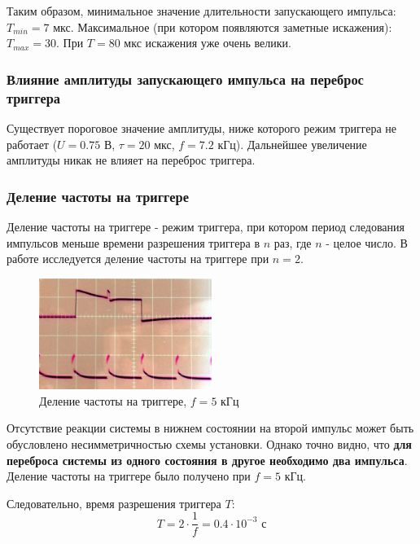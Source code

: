 \documentclass[a4paper,14pt]{extarticle}
\begin{document}
Таким образом, минимальное значение длительности запускающего импульса: $T_{min} = 7$ мкс.
Максимальное (при котором появляются заметные искажения): $T_{max} = 30$. При $T = 80$ мкс искажения уже очень велики. 

\subsubsection{Влияние амплитуды запускающего импульса на переброс триггера}
Существует пороговое значение амплитуды, ниже которого режим триггера не работает ($U = 0.75$ В, $\tau = 20$ мкс, $f = 7.2$ кГц). Дальнейшее увеличение амплитуды никак не влияет на переброс триггера.

\subsubsection{Деление частоты на триггере}
Деление частоты на триггере - режим триггера, при котором период следования импульсов меньше времени разрешения триггера в $n$ раз, где $n$ - целое число. В работе исследуется деление частоты на триггере при $n = 2$.
  
\begin{figure}[H]
	\centering
	\includegraphics[width=0.5\textwidth]{photo/del_f}
	\caption{Деление частоты на триггере, $f = 5$ кГц}
	\label{fig:figure2}
\end{figure}

Отсутствие реакции системы в нижнем состоянии на второй импульс может быть обусловлено несимметричностью схемы установки. Однако точно видно, что \textbf{для переброса системы из одного состояния в другое необходимо два импульса}. Деление частоты на триггере было получено при $f = 5$ кГц. 

Следовательно, время разрешения триггера $T$: 
\begin{equation}
	T = 2 \cdot \frac{1}{f} = 0.4 \cdot 10^{-3} \text{ с}
\end{equation}
\end{document}
